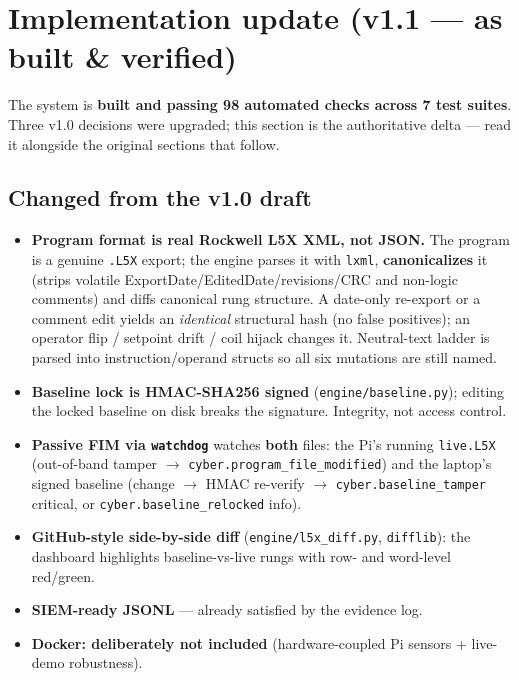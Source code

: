 \documentclass[11pt,a4paper]{article}
\newcommand{\code}[1]{\texttt{\small #1}}
\begin{document}
\section{Implementation update (v1.1 --- as built \& verified)}

\begin{keybox}
The system is \textbf{built and passing 98 automated checks across 7 test suites}.
Three v1.0 decisions were upgraded; this section is the authoritative delta ---
read it alongside the original sections that follow.
\end{keybox}

\subsection{Changed from the v1.0 draft}
\begin{itemize}[leftmargin=1.4em,itemsep=3pt]
  \item \textbf{Program format is real Rockwell L5X XML, not JSON.} The program is a
    genuine \code{.L5X} export; the engine parses it with \code{lxml},
    \textbf{canonicalizes} it (strips volatile ExportDate/EditedDate/revisions/CRC and
    non-logic comments) and diffs canonical rung structure. A date-only re-export or a
    comment edit yields an \emph{identical} structural hash (no false positives); an
    operator flip / setpoint drift / coil hijack changes it. Neutral-text ladder is
    parsed into instruction/operand structs so all six mutations are still named.
  \item \textbf{Baseline lock is HMAC-SHA256 signed} (\code{engine/baseline.py}); editing
    the locked baseline on disk breaks the signature. Integrity, not access control.
  \item \textbf{Passive FIM via \code{watchdog}} watches \textbf{both} files: the Pi's
    running \code{live.L5X} (out-of-band tamper $\rightarrow$ \code{cyber.program\_file\_modified})
    and the laptop's signed baseline (change $\rightarrow$ HMAC re-verify $\rightarrow$
    \code{cyber.baseline\_tamper} critical, or \code{cyber.baseline\_relocked} info).
  \item \textbf{GitHub-style side-by-side diff} (\code{engine/l5x\_diff.py}, \code{difflib}):
    the dashboard highlights baseline-vs-live rungs with row- and word-level red/green.
  \item \textbf{SIEM-ready JSONL} --- already satisfied by the evidence log.
  \item \textbf{Docker: deliberately not included} (hardware-coupled Pi sensors + live-demo
    robustness).
\end{itemize}
\end{document}

